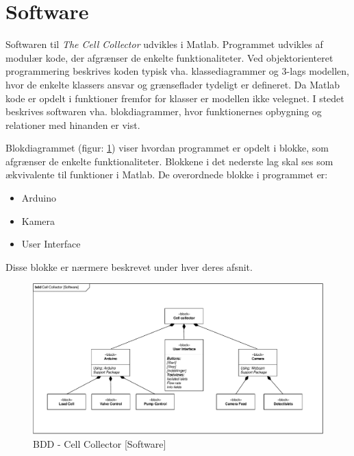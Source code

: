 \section{Software}
Softwaren til \textit{The Cell Collector} udvikles i Matlab. Programmet udvikles af modulær kode, der afgrænser de enkelte funktionaliteter. Ved objektorienteret programmering beskrives koden typisk vha. klassediagrammer og 3-lags modellen, hvor de enkelte klassers ansvar og grænseflader tydeligt er defineret. Da Matlab kode er opdelt i funktioner fremfor for klasser er modellen ikke velegnet. I stedet beskrives softwaren vha. blokdiagrammer, hvor funktionernes opbygning og relationer med hinanden er vist. 

Blokdiagrammet (figur: \ref{fig:bdd_software}) viser hvordan programmet er opdelt i blokke, som afgrænser de enkelte funktionaliteter. Blokkene i det nederste lag skal ses som ækvivalente til funktioner i Matlab.  
De overordnede blokke i programmet er:
\begin{itemize}
\item Arduino
\item Kamera
\item User Interface
\end{itemize}

Disse blokke er nærmere beskrevet under hver deres afsnit.

\begin{figure}[H]
	\centering
	\includegraphics[width=1\textwidth]{billeder/BDD_Software-crop.pdf}
	\caption{BDD - Cell Collector [Software]}
	\label{fig:bdd_software}
\end{figure}



